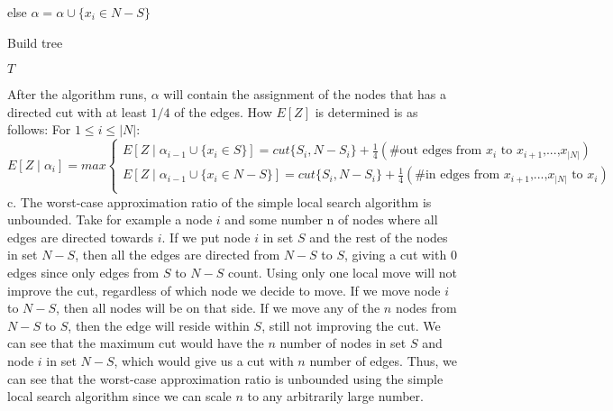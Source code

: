 \documentclass[oneside]{projectpaper} %
\begin{document}
\quad \quad else $\alpha = \alpha \cup \{x_i \in N-S\}$ \newline
\begin{algorithm}
\caption{Build tree}
\label{alg:buildtree}
\begin{algorithmic}
\ENDWHILE
\RETURN $T$
\end{algorithmic}
\end{algorithm}
\newline
After the algorithm runs, $\alpha$ will contain the assignment of the nodes that has a directed cut with at least $1/4$ of the edges. How $E[Z]$ is determined is as follows: \newline
For $1 \leq i \leq |N|$:
\begin{equation*}
  E[Z \mid \alpha_i] = max
  \begin{cases}
    E[Z \mid \alpha_{i-1} \cup \{x_i \in S\}] = cut\{S_i, N-S_i\} + \frac{1}{4}(\#\text{out edges from $x_i$ to $x_{i+1}$,...,$x_{|N|}$}) \\
    E[Z \mid \alpha_{i-1} \cup \{x_i \in N-S\}] = cut\{S_i, N-S_i\} + \frac{1}{4}(\#\text{in edges from $x_{i+1}$,...,$x_{|N|}$ to $x_i$})\\
  \end{cases}
\end{equation*}
\newline
\newline
{\large c.} The worst-case approximation ratio of the simple local search algorithm is unbounded. Take for example a node $i$ and some number n of nodes where all edges are directed towards $i$. If we put node $i$ in set $S$ and the rest of the nodes in set $N-S$, then all the edges are directed from $N-S$ to $S$, giving a cut with 0 edges since only edges from $S$ to $N-S$ count. Using only one local move will not improve the cut, regardless of which node we decide to move. If we move node $i$ to $N-S$, then all nodes will be on that side. If we move any of the $n$ nodes from $N-S$ to $S$, then the edge will reside within $S$, still not improving the cut. We can see that the maximum cut would have the $n$ number of nodes in set $S$ and node $i$ in set $N-S$, which would give us a cut with $n$ number of edges. Thus, we can see that the worst-case approximation ratio is unbounded using the simple local search algorithm since we can scale $n$ to any arbitrarily large number.
\end{document}

